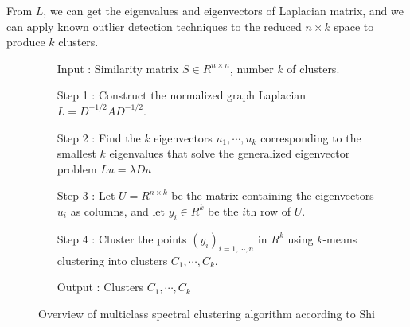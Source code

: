 From $L$, we can get the eigenvalues and eigenvectors of Laplacian matrix, and we can apply known outlier detection techniques \cite{knorr00} to the reduced $n \times k$ space to produce $k$ clusters. 
\begin{figure}[ht]
\begin{mdframed}
\begin{enumerate}
\item[Input] : Similarity matrix $S \in R^{n \times n}$, number $k$ of clusters. 
\item[Step 1] : Construct the normalized graph Laplacian $L = D^{-1/2} A D^{-1/2}$.
\item[Step 2] : Find the $k$ eigenvectors $u_1, \cdots, u_k$ corresponding to the smallest $k$ eigenvalues that solve the generalized eigenvector problem $L u = \lambda D u$ 
\item[Step 3] : Let $U = R^{n \times k}$ be the matrix containing the eigenvectors $u_i$ as columns, and let $y_i \in R^k$ be the $i$th row of $U$.
\item[Step 4] : Cluster the points $(y_i)_{i=1,\cdots,n}$ in $R^k$ using $k$-means clustering into clusters $C_1,\cdots,C_k$.
\item[Output] : Clusters $C_1, \cdots, C_k$
\end{enumerate}
\end{mdframed}
\caption{Overview of multiclass spectral clustering algorithm according to Shi}
\end{figure}

